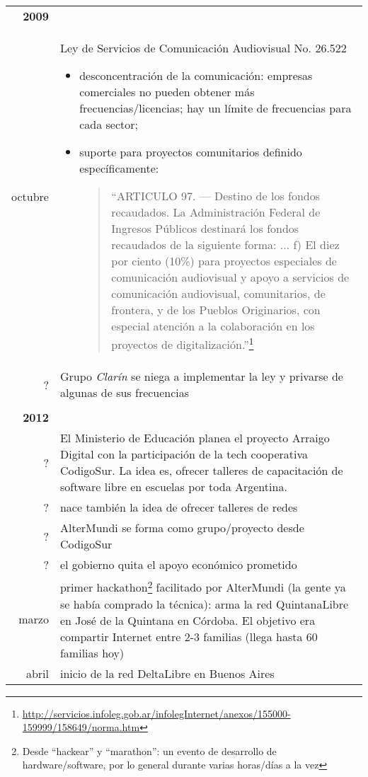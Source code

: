 \begin{longtable}{ r | p{}}
\textbf{2009} & \\
octubre & Ley de Servicios de Comunicación Audiovisual No. 26.522
  \begin{itemize}
    \item desconcentración de la comunicación: empresas comerciales no pueden obtener más frecuencias/licencias; hay un límite de frecuencias para cada sector;
    \item suporte para proyectos comunitarios definido específicamente:
    \begin{quotation}
``ARTICULO 97. — Destino de los fondos recaudados. La Administración Federal de Ingresos Públicos destinará los fondos recaudados de la siguiente forma:
...
f) El diez por ciento (10\%) para proyectos especiales de comunicación audiovisual y apoyo a servicios de comunicación audiovisual, comunitarios, de frontera, y de los Pueblos Originarios, con especial atención a la colaboración en los proyectos de digitalización.''\footnote{\url{http://servicios.infoleg.gob.ar/infolegInternet/anexos/155000-159999/158649/norma.htm}}
\end{quotation}
  \end{itemize}\\
 ? & Grupo \textit{Clarín} se niega a implementar la ley y privarse de algunas de sus frecuencias\\
  & \\
\textbf{2012} & \\
  ? & El Ministerio de Educación planea el proyecto Arraigo Digital con la participación de la tech cooperativa CodigoSur. La idea es, ofrecer talleres de capacitación de software libre en escuelas por toda Argentina. \\
  ? & nace también la idea de ofrecer talleres de redes \\
  ? & AlterMundi se forma como grupo/proyecto desde CodigoSur \\
  ? & el gobierno quita el apoyo económico prometido \\
  marzo & primer hackathon\footnote{Desde ``hackear'' y ``marathon'': un evento de desarrollo de hardware/software, por lo general durante varias horas/días a la vez} facilitado por AlterMundi (la gente ya se había comprado la técnica): arma la red QuintanaLibre en José de la Quintana en Córdoba. El objetivo era compartir Internet entre 2-3 familias (llega hasta 60 familias hoy) \\
  abril & inicio de la red DeltaLibre en Buenos Aires \\

\end{longtable}
